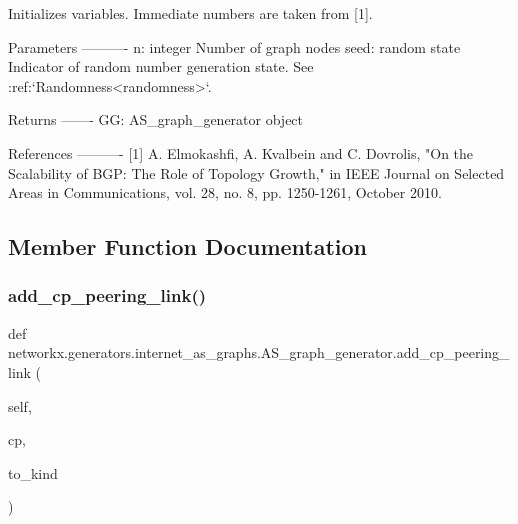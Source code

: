 \begin{DoxyVerb}Initializes variables. Immediate numbers are taken from [1].

Parameters
----------
n: integer
    Number of graph nodes
seed: random state
    Indicator of random number generation state.
    See :ref:`Randomness<randomness>`.

Returns
-------
GG: AS_graph_generator object

References
----------
[1] A. Elmokashfi, A. Kvalbein and C. Dovrolis, "On the Scalability of
BGP: The Role of Topology Growth," in IEEE Journal on Selected Areas
in Communications, vol. 28, no. 8, pp. 1250-1261, October 2010.
\end{DoxyVerb}
 

\subsection{Member Function Documentation}
\mbox{\label{classnetworkx_1_1generators_1_1internet__as__graphs_1_1AS__graph__generator_a7f0fd0b911e9035e89d416b25271e6b0}} 
\subsubsection{\texorpdfstring{add\+\_\+cp\+\_\+peering\+\_\+link()}{add\_cp\_peering\_link()}}
{\footnotesize\ttfamily def networkx.\+generators.\+internet\+\_\+as\+\_\+graphs.\+A\+S\+\_\+graph\+\_\+generator.\+add\+\_\+cp\+\_\+peering\+\_\+link (\begin{DoxyParamCaption}\item[{}]{self,  }\item[{}]{cp,  }\item[{}]{to\+\_\+kind }\end{DoxyParamCaption})}

